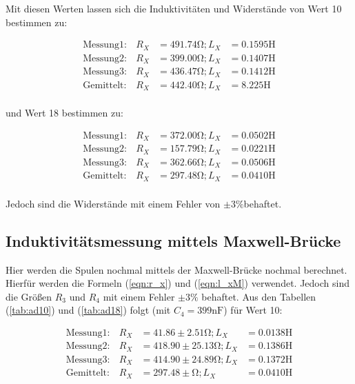 Mit diesen Werten lassen sich die Induktivitäten und Widerstände von Wert 10 bestimmen zu:

\begin{align*}
\text{Messung}1:& R_X &= 491.74 \si{\ohm}; L_X &=  0.1595 \si{\henry}\\
\text{Messung}2:& R_X &= 399.00 \si{\ohm}; L_X &=  0.1407  \si{\henry}\\
\text{Messung}3:& R_X &= 436.47 \si{\ohm}; L_X &=  0.1412   \si{\henry}\\
\text{Gemittelt}:& R_X &= 442.40 \si{\ohm}; L_X &= 8.225  \si{\henry}\\
\end{align*}

und Wert 18 bestimmen zu:

\begin{align*}
\text{Messung}1:& R_X &= 372.00 \si{\ohm}; L_X &=  0.0502 \si{\henry}\\
\text{Messung}2:& R_X &= 157.79 \si{\ohm}; L_X &=  0.0221 \si{\henry}\\
\text{Messung}3:& R_X &= 362.66 \si{\ohm}; L_X &=  0.0506 \si{\henry}\\
\text{Gemittelt}:& R_X &=297.48 \si{\ohm}; L_X &=  0.0410 \si{\henry}\\
\end{align*}

Jedoch sind die Widerstände mit einem Fehler von $\pm 3\% $behaftet.


\subsection{Induktivitätsmessung mittels Maxwell-Brücke}

Hier werden die Spulen nochmal mittels der Maxwell-Brücke nochmal berechnet. Hierfür werden die Formeln  (\ref{eqn:r_x}) und (\ref{eqn:l_xM}) verwendet.
Jedoch sind die Größen $R_3$ und $R_4$ mit einem Fehler $\pm 3\%$ behaftet. Aus den Tabellen (\ref{tab:ad10}) und (\ref{tab:ad18}) folgt (mit $C_4 = 399 \si{\nano\farad} $) für Wert 10:

\begin{align*}
\text{Messung}1:& R_X &=  41.86 \pm 2.51  \si{\ohm}; L_X &=  0.0138 \si{\henry}\\
\text{Messung}2:& R_X &= 418.90 \pm 25.13 \si{\ohm}; L_X &=  0.1386 \si{\henry}\\
\text{Messung}3:& R_X &= 414.90 \pm 24.89 \si{\ohm}; L_X &=  0.1372 \si{\henry}\\
\text{Gemittelt}:& R_X&= 297.48 \pm  \si{\ohm}; L_X &=  0.0410 \si{\henry}\\ %
\end{align*}

